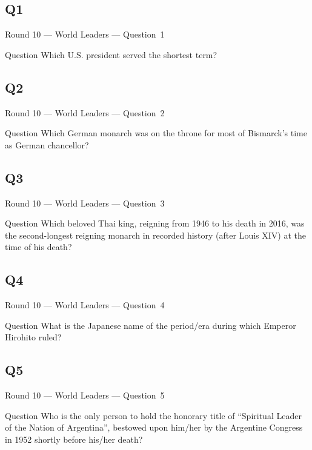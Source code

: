 \documentclass[11pt]{beamer}
\begin{document}
\subsection*{Q1}
\begin{frame}[t]{Round 10 --- World Leaders --- \mbox{Question 1}}
\vspace{-0.5em}
\begin{block}{Question}
Which U.S. president served the shortest term?
\end{block}
\end{frame}
\subsection*{Q2}
\begin{frame}[t]{Round 10 --- World Leaders --- \mbox{Question 2}}
\vspace{-0.5em}
\begin{block}{Question}
Which German monarch was on the throne for most of Bismarck's time as German chancellor?
\end{block}
\end{frame}
\subsection*{Q3}
\begin{frame}[t]{Round 10 --- World Leaders --- \mbox{Question 3}}
\vspace{-0.5em}
\begin{block}{Question}
Which beloved Thai king, reigning from 1946 to his death in 2016, was the second-longest reigning monarch in recorded history (after Louis XIV) at the time of his death?
\end{block}
\end{frame}
\subsection*{Q4}
\begin{frame}[t]{Round 10 --- World Leaders --- \mbox{Question 4}}
\vspace{-0.5em}
\begin{block}{Question}
What is the Japanese name of the period/era during which Emperor Hirohito ruled?
\end{block}
\end{frame}
\subsection*{Q5}
\begin{frame}[t]{Round 10 --- World Leaders --- \mbox{Question 5}}
\vspace{-0.5em}
\begin{block}{Question}
Who is the only person to hold the honorary title of ``Spiritual Leader of the Nation of Argentina'', bestowed upon him/her by the Argentine Congress in 1952 shortly before his/her death?
\end{block}
\end{frame}
\end{document}
